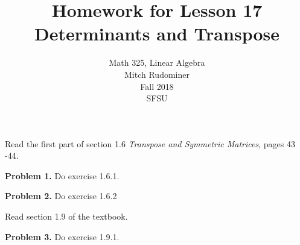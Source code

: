 \documentclass[oneside,12pt]{amsart}
\begin{document}
\title{Homework for Lesson 17 \\ Determinants and Transpose}
\author{Math 325, Linear Algebra \\ Mitch Rudominer \\ Fall 2018 \\ SFSU }
\date{}

\maketitle

\bigskip

Read the first part of section 1.6 \emph{Transpose and Symmetric Matrices}, pages 43 -44.

\bigskip

\textbf{Problem 1.} Do exercise 1.6.1.

\bigskip
\bigskip
\bigskip


\textbf{Problem 2.} Do exercise 1.6.2

\bigskip
\bigskip
\bigskip

Read section 1.9 of the textbook.

\bigskip

\textbf{Problem 3.} Do exercise 1.9.1.
\end{document}
